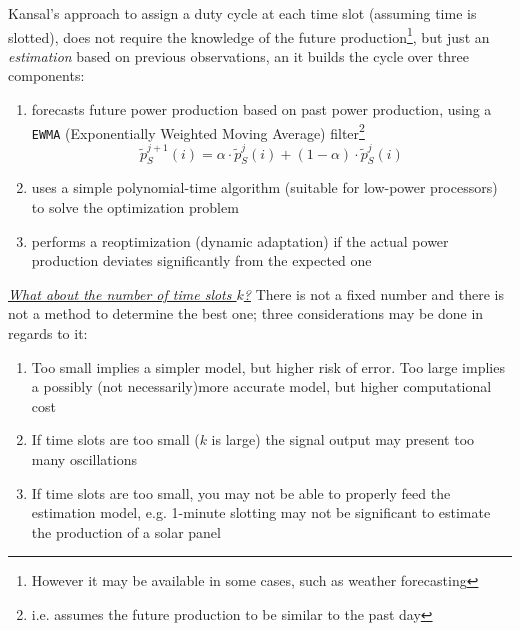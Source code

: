 Kansal's approach to assign a duty cycle at each time slot (assuming time is slotted), does not require the knowledge of the future production\footnote{However it may be available in some cases, such as weather forecasting}, but just an \textit{estimation} based on previous observations, an it builds the cycle over three components:
\begin{enumerate}
   \item forecasts future power production based on past power production, using a \texttt{EWMA} (Exponentially Weighted Moving Average) filter\footnote{i.e. assumes the future production to be similar to the past day}
   \begin{equation}
      \tilde{p}^{j+1}_S(i) = \alpha \cdot\tilde{p}^j_S(i) + (1-\alpha)\cdot\tilde{p}^j_S(i)
   \end{equation}
   \item uses a simple polynomial-time algorithm (suitable for low-power processors) to solve the
   optimization problem
   \item performs a reoptimization (dynamic adaptation) if the actual power production deviates
   significantly from the expected one
\end{enumerate}



\textit{\ul{What about the number of time slots $k$?}} There is not a fixed number and there is not a method to determine the best one; three considerations may be done in regards to it:

\begin{enumerate}
   \item Too small implies a simpler model, but higher risk of error. Too large implies a possibly (not necessarily)more accurate model, but higher computational cost
   \item If time slots are too small ($k$ is large) the signal output may present too many oscillations
   \item If time slots are too small, you may not be able to properly feed the estimation model, e.g. 1-minute slotting may not be significant to estimate the production of a solar panel
\end{enumerate}

